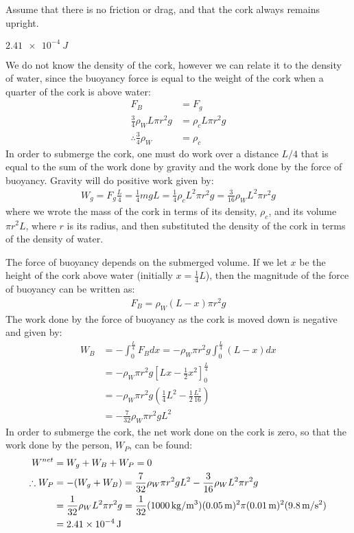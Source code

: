 Assume that there is no friction or drag, and that the cork always remains upright. 
\begin{finalanswer}
	$\SI{2.41e-4}{J}$
\end{finalanswer}
\begin{solution}
	We do not know the density of the cork, however we can relate it to the density of water, since the buoyancy force is equal to the weight of the cork when a quarter of the cork is above water:
	\begin{align*}
	F_B &= F_g\\
	\frac{3}{4}\rho_WL\pi r^2 g &= \rho_c L \pi r^2 g\\
	\therefore \frac{3}{4}\rho_W&= \rho_c
	\end{align*}
	In order to submerge the cork, one must do work over a distance $L/4$ that is equal to the sum of the work done by gravity and the work done by the force of buoyancy. Gravity will do positive work given by:
	\begin{align*}
	W_g = F_g \frac{L}{4}=\frac{1}{4}mgL =\frac{1}{4} \rho_c L^2 \pi r^2 g=\frac{3}{16} \rho_W L^2 \pi r^2 g
	\end{align*}
	where we wrote the mass of the cork in terms of its density, $\rho_c$, and its volume $\pi r^2 L$, where $r$ is its radius, and then substituted the density of the cork in terms of the density of water.
	
	The force of buoyancy depends on the submerged volume. If we let $x$ be the height of the cork above water (initially $x=\frac{1}{4}L$), then the magnitude of the force of buoyancy can be written as:
	\begin{align*}
	F_B=\rho_W(L-x)\pi r^2 g
	\end{align*}
	The work done by the force of buoyancy as the cork is moved down is negative and given by:
	\begin{align*}
	W_B&=-\int_0^{\frac{L}{4}}F_Bdx=-\rho_W\pi r^2g\int_0^{\frac{L}{4}}(L-x)dx\\
	&=-\rho_W\pi r^2g\left[Lx-\frac{1}{2}x^2 \right]_0^{\frac{L}{4}}\\
	&=-\rho_W\pi r^2g\left(\frac{1}{4}L^2-\frac{1}{2}\frac{L^2}{16}   \right)\\
	&=-\frac{7}{32}\rho_W\pi r^2gL^2
	\end{align*}
	In order to submerge the cork, the net work done on the cork is zero, so that the work done by the person, $W_P$, can be found:
	\begin{align*}
	W^{net}&=W_g+W_B+W_P=0\\
	\therefore W_P&=-(W_g+W_B)=\frac{7}{32}\rho_W\pi r^2gL^2-\frac{3}{16} \rho_W L^2 \pi r^2 g\\
	&=\frac{1}{32} \rho_W L^2 \pi r^2 g = \frac{1}{32} (\SI{1000}{kg/m^3}) (\SI{0.05}{m})^2 \pi (\SI{0.01}{m})^2 (\SI{9.8}{m/s^2})\\
	&=\SI{2.41E-4}{J}
	\end{align*}
	
\end{solution}


